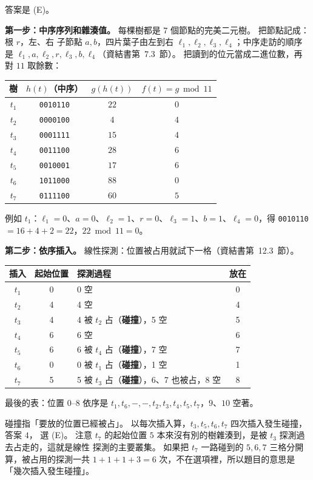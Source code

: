 \begin{pastsoln}
答案是 (E)。

\textbf{第一步：中序序列和雜湊值。} 每棵樹都是 $7$ 個節點的完美二元樹。 把節點記成：根 $r$，左、右
子節點 $a, b$，四片葉子由左到右 $\ell_1, \ell_2, \ell_3, \ell_4$；中序走訪的順序是
$\ell_1, a, \ell_2, r, \ell_3, b, \ell_4$（資結書第~7.3~節）。 把讀到的位元當成二進位數，再對 $11$
取餘數：
\begin{center}
\small
\begin{tabular}{cccc}
\toprule
樹 & $h(t)$（中序） & $g(h(t))$ & $f(t) = g \bmod 11$ \\
\midrule
$t_1$ & \texttt{0010110} & $22$ & $0$ \\
$t_2$ & \texttt{0000100} & $4$ & $4$ \\
$t_3$ & \texttt{0001111} & $15$ & $4$ \\
$t_4$ & \texttt{0011100} & $28$ & $6$ \\
$t_5$ & \texttt{0010001} & $17$ & $6$ \\
$t_6$ & \texttt{1011000} & $88$ & $0$ \\
$t_7$ & \texttt{0111100} & $60$ & $5$ \\
\bottomrule
\end{tabular}
\end{center}
例如 $t_1$：$\ell_1 = 0$、$a = 0$、$\ell_2 = 1$、$r = 0$、$\ell_3 = 1$、$b = 1$、$\ell_4 = 0$，得
\texttt{0010110} $= 16 + 4 + 2 = 22$，$22 \bmod 11 = 0$。

\textbf{第二步：依序插入。} 線性探測：位置被占用就試下一格（資結書第~12.3~節）。
\begin{center}
\small
\begin{tabular}{cclc}
\toprule
插入 & 起始位置 & 探測過程 & 放在 \\
\midrule
$t_1$ & 0 & 0 空 & 0 \\
$t_2$ & 4 & 4 空 & 4 \\
$t_3$ & 4 & 4 被 $t_2$ 占（\textbf{碰撞}），5 空 & 5 \\
$t_4$ & 6 & 6 空 & 6 \\
$t_5$ & 6 & 6 被 $t_4$ 占（\textbf{碰撞}），7 空 & 7 \\
$t_6$ & 0 & 0 被 $t_1$ 占（\textbf{碰撞}），1 空 & 1 \\
$t_7$ & 5 & 5 被 $t_3$ 占（\textbf{碰撞}），6、7 也被占，8 空 & 8 \\
\bottomrule
\end{tabular}
\end{center}
最後的表：位置 $0$--$8$ 依序是 $t_1, t_6, -, -, t_2, t_3, t_4, t_5, t_7$，$9$、$10$ 空著。

碰撞指「要放的位置已經被占」。 以每次插入算，$t_3, t_5, t_6, t_7$ 四次插入發生碰撞，答案 $4$，
選 (E)。 注意 $t_7$ 的起始位置 $5$ 本來沒有別的樹雜湊到，是被 $t_3$ 探測過去占走的，這就是線性
探測的主要叢集。 如果把 $t_7$ 一路碰到的 $5, 6, 7$ 三格分開算，被占用的探測一共
$1 + 1 + 1 + 3 = 6$ 次，不在選項裡，所以題目的意思是「幾次插入發生碰撞」。
\end{pastsoln}
